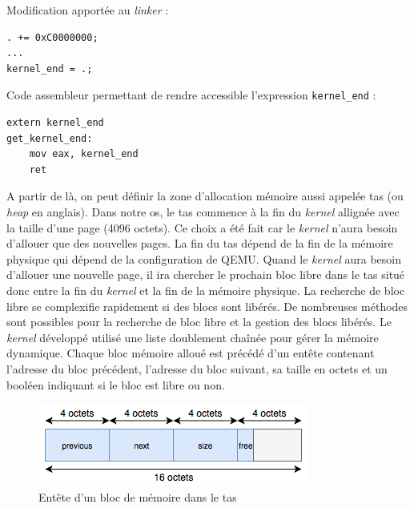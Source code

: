 Modification apportée au \textit{linker} :
\begin{verbatim}
. += 0xC0000000;
...
kernel_end = .;
\end{verbatim}

Code assembleur permettant de rendre accessible l'expression \texttt{kernel_end} :
\begin{verbatim}
extern kernel_end
get_kernel_end:
    mov eax, kernel_end
    ret
\end{verbatim}

A partir de là, on peut définir la zone d'allocation mémoire aussi appelée tas
(ou \textit{heap} en anglais). Dans notre \acrshort{os}, le tas commence à la
fin du \textit{kernel} allignée avec la taille d'une page (4096 octets). Ce choix
a été fait car le \textit{kernel} n'aura besoin d'allouer que des nouvelles
pages. La fin du tas dépend de la fin de la mémoire physique qui dépend de la
configuration de QEMU. Quand le \textit{kernel} aura besoin d'allouer une nouvelle
page, il ira chercher le prochain bloc libre dans le tas situé donc entre la fin
du \textit{kernel} et la fin de la mémoire physique. La recherche de bloc libre
se complexifie rapidement si des blocs sont libérés. De nombreuses méthodes sont
possibles pour la recherche de bloc libre et la gestion des blocs libérés. Le
\textit{kernel} développé utilisé une liste doublement chaînée pour gérer la
mémoire dynamique. Chaque bloc mémoire alloué est précédé d'un entête contenant
l'adresse du bloc précédent, l'adresse du bloc suivant, sa taille en octets et
un booléen indiquant si le bloc est libre ou non.

\begin{figure}[!h]
  \centering
  \includegraphics[scale=0.65]{images/heap_header.png}
  \caption{Entête d'un bloc de mémoire dans le tas}
  \label{heap_header}
\end{figure}